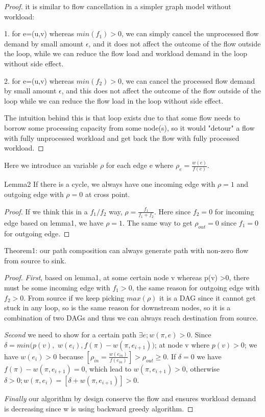 \documentclass{sig-alternate}
\begin{document}
\begin{proof} it is similar to flow cancellation in a simpler graph model without workload: 

1. for e=(u,v) whereas $min(f_1) >0$, we can simply cancel the unprocessed flow demand by small amount $\epsilon$, and it does not affect the outcome of the flow outside the loop, while we can reduce the flow load and workload demand in the loop without side effect. 

2. for e=(u,v) whereas $min(f_2)>0$, we can cancel the processed flow demand by small amount $\epsilon$, and this does not affect the outcome of the flow outside of the loop while we can reduce the flow load in the loop without side effect. 


The intuition behind this is that loop exists due to that some flow needs to borrow some processing capacity from some node(s), so it would "detour" a flow with fully unprocessed workload and get back the flow with fully processed workload. 
\end{proof}

Here we introduce an variable $\rho$ for each edge e where $\rho_{e} = \frac{ w(e)}{f(e)}$.

Lemma2
If there is a cycle, we always have one incoming edge with $\rho =1$ and outgoing edge with $\rho =0$ at cross point.

\begin{proof}
If we think this in a $f_1/f_2$ way, $\rho = \frac{ f_1} {f_1+f_2 }$. Here since $f_2=0$ for incoming edge based on lemma1, we have $\rho=1$. The same way to get $\rho_{out}=0$ since $f_1=0$ for outgoing edge. 
\end{proof}

Theorem1: our path composition can always generate path with non-zero flow from source to sink. 

\begin{proof}
\textit{First}, based on lemma1, at some certain node v whereas p(v) >0, there must be some incoming edge with $f_1>0$, the same reason for outgoing edge with $f_2>0$. From source if we keep picking $max(\rho)$ it is a DAG since it cannot get stuck in any loop, so is the same reason for downstream nodes, so it is a combination of two DAGs and thus we can always reach destination from source. 
 
\textit{Second} we need to show for a certain path $\exists e; w(\pi, e)>0$. Since $\delta = min( p(v),$ $w(e_{i}),f(\pi) -w(\pi,e_{i+1}))$; at node v where $p(v)>0$; we have $w(e_i)>0$ because $[\rho_{in} =\frac{ w(e_{in})}{f(e_{in})} ]>\rho_{out}\geq 0$. If $\delta=0$ we have $ f(\pi) -w(\pi,e_{i+1}) =0$, which lead to $ w(\pi, e_{i+1})>0$, otherwise $ \delta>0;w(\pi, e_i) = [ \delta+w(\pi, e_{i+1} )]>0$.

\textit{Finally} our algorithm by design conserve the flow and ensures workload demand is decreasing since w is using backward greedy algorithm.
\end{proof}
\end{document}
